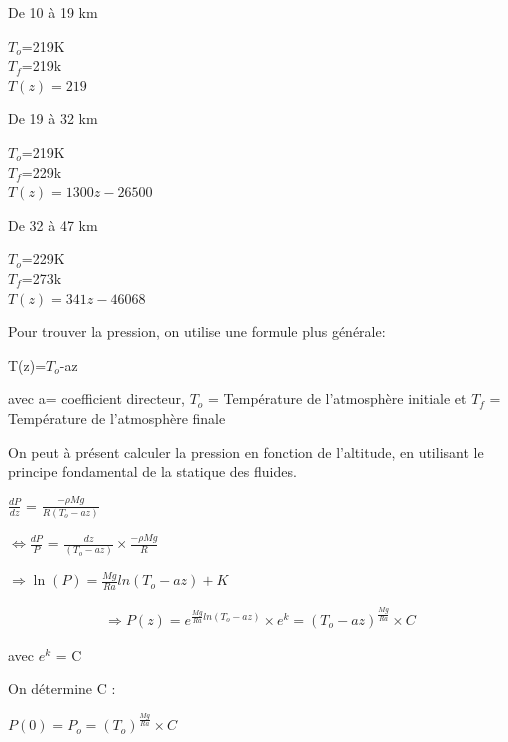 \documentclass[a4paper, 12pt]{report} %
\begin{document}
De 10 à 19 km 
\begin{center}
    $T_o$=219K\\
    $T_f$=219k\\
    $T(z)=219$
\end{center}

De 19 à 32 km 
\begin{center}
    $T_o$=219K\\
    $T_f$=229k\\
    $T(z)=1300z-26500$
\end{center}

De 32 à 47 km 
\begin{center}
    $T_o$=229K\\
    $T_f$=273k\\
    $T(z)=341z-46068$
\end{center}

\noindent Pour trouver la pression, on utilise une formule plus générale:
\begin{center}
T(z)=$T_o$-az      
\end{center}

\noindent avec a= coefficient directeur, $T_o$ = Température de l'atmosphère initiale et $T_f$ = Température de l'atmosphère finale \vspace{\baselineskip}

On peut à présent calculer la pression en fonction de l'altitude, en utilisant le principe fondamental de la statique des fluides. 
\begin{center}
     $\frac{dP}{dz}$ = $\frac{-\rho Mg}{R(T_o-az)}$ 
\end{center}

\begin{center}
$\Leftrightarrow \frac{dP}{P}$ = $\frac{dz}{(T_o-az)} \times \frac{-\rho Mg}{R}$
\end{center}

\begin{center}
     $\Rightarrow \ln(P)=\frac{Mg}{Ra} ln(T_o-az)+K$\\
\end{center}

\begin{align*}
     \Rightarrow P(z) = e^{\frac{Mg}{Ra}ln(T_o-az)} \times e^k =(T_o -az)^{\frac{Mg}{Ra}} \times C
\end{align*}

avec $e^{k}$ = C \vspace{\baselineskip}

On détermine C :
\begin{center}
$P(0)= P_o = (T_o)^{\frac{Mg}{Ra}} \times C$
\end{center}
\end{document}
